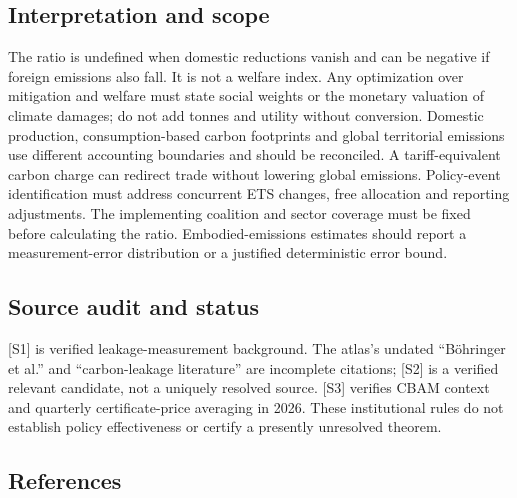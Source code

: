 \documentclass[11pt,a4paper]{article}
\begin{document}
\subsection*{Interpretation and scope}
The ratio is undefined when domestic reductions vanish and can be negative if foreign emissions also fall. It is not a welfare index. Any optimization over mitigation and welfare must state social weights or the monetary valuation of climate damages; do not add tonnes and utility without conversion. Domestic production, consumption-based carbon footprints and global territorial emissions use different accounting boundaries and should be reconciled. A tariff-equivalent carbon charge can redirect trade without lowering global emissions. Policy-event identification must address concurrent ETS changes, free allocation and reporting adjustments. The implementing coalition and sector coverage must be fixed before calculating the ratio. Embodied-emissions estimates should report a measurement-error distribution or a justified deterministic error bound.

\subsection*{Source audit and status}
[S1] is verified leakage-measurement background. The atlas’s undated ``Böhringer et al.'' and ``carbon-leakage literature'' are incomplete citations; [S2] is a verified relevant candidate, not a uniquely resolved source. [S3] verifies CBAM context and quarterly certificate-price averaging in 2026. These institutional rules do not establish policy effectiveness or certify a presently unresolved theorem.

\subsection*{References}
\end{document}

